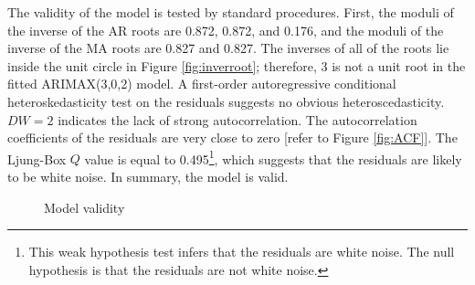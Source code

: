 \documentclass[review,3p,times,12pt,number]{elsarticle}
\begin{document}
The validity of the model is tested by standard procedures. First, the moduli of the inverse of the AR roots are 0.872, 0.872, and 0.176, and the moduli of the inverse of the MA roots are 0.827 and 0.827. The inverses of all of the roots lie inside the unit circle in Figure \ref{fig:inverroot}; therefore, 3 is not a unit root in the fitted ARIMAX(3,0,2) model. A first-order autoregressive conditional heteroskedasticity test on the residuals suggests no obvious heteroscedasticity. $DW=2$ indicates the lack of strong autocorrelation. The autocorrelation coefficients of the residuals are very close to zero [refer to Figure \ref{fig:ACF}]. The Ljung-Box $Q$ value is equal to 0.495\footnote{This weak hypothesis test infers that the residuals are white noise. The null hypothesis is that the residuals are not white noise.}, which suggests that the residuals are likely to be white noise. In summary, the model is valid.

\begin{figure}[htbp]
\centering
{}
\caption{Model validity}
\end{figure}
\end{document}
